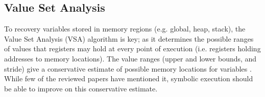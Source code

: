 

\subsection{Value Set Analysis}

To recovery variables stored in memory regions (e.g. global, heap, stack), the Value Set Analysis (VSA) algorithm is key; as it determines the possible ranges of values that registers may hold at every point of execution (i.e. registers holding addresses to memory locations). The value ranges (upper and lower bounds, and stride) give a conservative estimate of possible memory locations for variables \cite{wysinwyx}. While few of the reviewed papers have mentioned it, symbolic execution should be able to improve on this conservative estimate.

